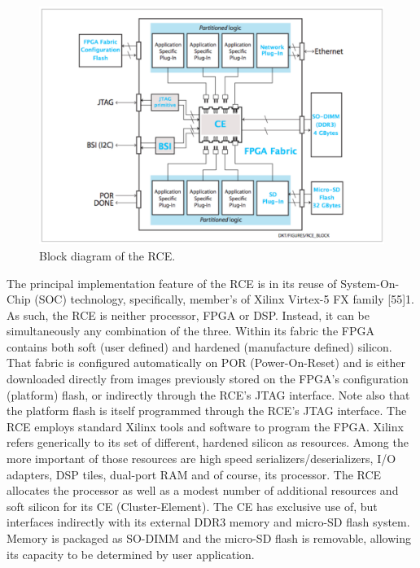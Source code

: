 \begin{figure}[tbh]
\includegraphics[scale=0.8]{rce-block.pdf}
\caption{Block diagram of the RCE.}
\label{fig:RCEblock}
\end{figure} 

The principal implementation feature of the RCE is in its reuse of System-On-Chip (SOC) technology, specifically, member's of Xilinx Virtex-5 FX family [55]1. As such, the RCE is neither processor, FPGA or DSP. Instead, it can be simultaneously any combination of the three. Within its fabric the FPGA contains both soft (user defined) and hardened (manufacture defined) silicon. That fabric is configured automatically on POR (Power-On-Reset) and is either downloaded directly from images previously stored on the FPGA's configuration (platform) flash, or indirectly through the RCE's JTAG interface. Note also that the platform flash is itself programmed through the RCE's JTAG interface. The RCE employs standard Xilinx tools and software to program the FPGA.
Xilinx refers generically to its set of different, hardened silicon as resources. Among the more important of those resources are high speed serializers/deserializers, I/O adapters, DSP tiles, dual-port RAM and of course, its processor. The RCE allocates the processor as well as a modest number of additional resources and soft silicon for its CE (Cluster-Element). The CE has exclusive use of, but interfaces indirectly with its external DDR3 memory and micro-SD flash system. Memory is packaged as SO-DIMM and the micro-SD flash is removable, allowing its capacity to be determined by user application.


